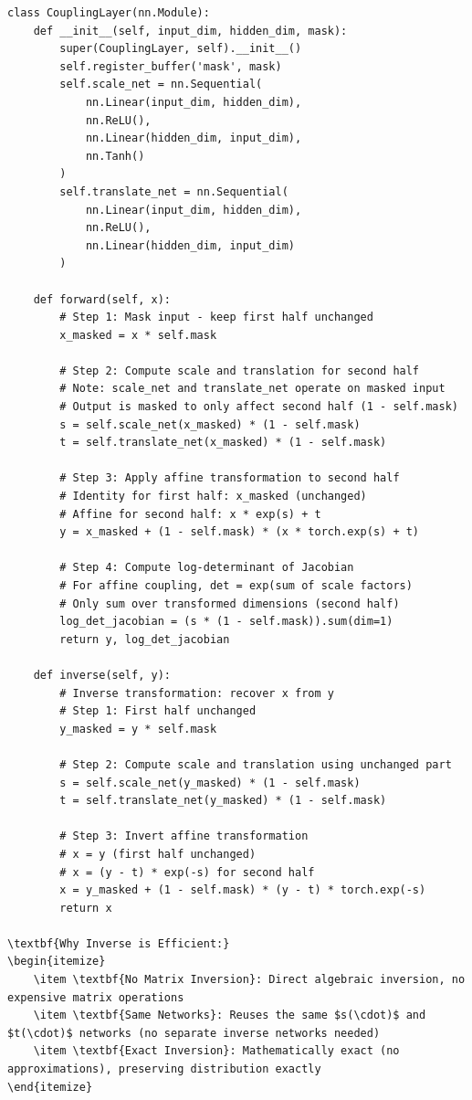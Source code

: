 \documentclass[conference,12pt]{IEEEtran}
\begin{document}
\begin{lstlisting}[caption={RealNVP Model Implementation}]
class CouplingLayer(nn.Module):
    def __init__(self, input_dim, hidden_dim, mask):
        super(CouplingLayer, self).__init__()
        self.register_buffer('mask', mask)
        self.scale_net = nn.Sequential(
            nn.Linear(input_dim, hidden_dim),
            nn.ReLU(),
            nn.Linear(hidden_dim, input_dim),
            nn.Tanh()
        )
        self.translate_net = nn.Sequential(
            nn.Linear(input_dim, hidden_dim),
            nn.ReLU(),
            nn.Linear(hidden_dim, input_dim)
        )

    def forward(self, x):
        # Step 1: Mask input - keep first half unchanged
        x_masked = x * self.mask
        
        # Step 2: Compute scale and translation for second half
        # Note: scale_net and translate_net operate on masked input
        # Output is masked to only affect second half (1 - self.mask)
        s = self.scale_net(x_masked) * (1 - self.mask)
        t = self.translate_net(x_masked) * (1 - self.mask)
        
        # Step 3: Apply affine transformation to second half
        # Identity for first half: x_masked (unchanged)
        # Affine for second half: x * exp(s) + t
        y = x_masked + (1 - self.mask) * (x * torch.exp(s) + t)
        
        # Step 4: Compute log-determinant of Jacobian
        # For affine coupling, det = exp(sum of scale factors)
        # Only sum over transformed dimensions (second half)
        log_det_jacobian = (s * (1 - self.mask)).sum(dim=1)
        return y, log_det_jacobian

    def inverse(self, y):
        # Inverse transformation: recover x from y
        # Step 1: First half unchanged
        y_masked = y * self.mask
        
        # Step 2: Compute scale and translation using unchanged part
        s = self.scale_net(y_masked) * (1 - self.mask)
        t = self.translate_net(y_masked) * (1 - self.mask)
        
        # Step 3: Invert affine transformation
        # x = y (first half unchanged)
        # x = (y - t) * exp(-s) for second half
        x = y_masked + (1 - self.mask) * (y - t) * torch.exp(-s)
        return x
        
\textbf{Why Inverse is Efficient:}
\begin{itemize}
    \item \textbf{No Matrix Inversion}: Direct algebraic inversion, no expensive matrix operations
    \item \textbf{Same Networks}: Reuses the same $s(\cdot)$ and $t(\cdot)$ networks (no separate inverse networks needed)
    \item \textbf{Exact Inversion}: Mathematically exact (no approximations), preserving distribution exactly
\end{itemize}
\end{lstlisting}
\end{document}
